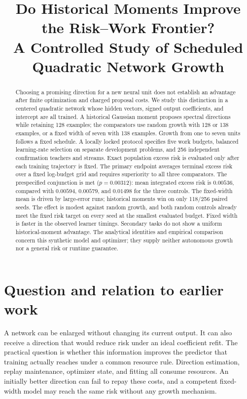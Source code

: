 \documentclass[10pt]{article}
\title{Do Historical Moments Improve the Risk--Work Frontier?\\
\large A Controlled Study of Scheduled Quadratic Network Growth}
\begin{document}
\maketitle
\begin{abstract}
Choosing a promising direction for a new neural unit does not establish an
advantage after finite optimization and charged proposal costs. We study
this distinction in a centered quadratic network whose hidden vectors,
signed output coefficients, and intercept are all trained. A historical
Gaussian moment proposes spectral directions while retaining 128 examples;
the comparators use random growth with 128 or 138 examples, or a fixed
width of seven with 138 examples. Growth from one to seven units follows
a fixed schedule. A locally locked protocol specifies five work budgets,
balanced learning-rate selection on separate development problems, and
256 independent confirmation teachers and streams. Exact population
excess risk is evaluated only after each training trajectory is fixed.
The primary endpoint averages terminal excess risk over a fixed
log-budget grid and requires superiority to all three comparators.
The prespecified conjunction is met ($p=0.00312$): mean integrated
excess risk is $0.00536$, compared with $0.00594$, $0.00579$, and
$0.01498$ for the three controls. The fixed-width mean is driven by
large-error runs; historical moments win on only 118/256 paired seeds.
The effect is modest against random growth, and both random controls already meet the fixed risk target
on every seed at the smallest evaluated budget. Fixed width is faster
in the observed learner timings. Secondary tasks do not show a
uniform historical-moment advantage.
The analytical identities and empirical comparison concern this synthetic
model and optimizer; they supply neither autonomous growth nor a general
risk or runtime guarantee.
\end{abstract}

\section{Question and relation to earlier work}
\label{sec:introduction}

A network can be enlarged without changing its current output. It can
also receive a direction that would reduce risk under an ideal coefficient
refit. The practical question is whether this information improves the
predictor that training actually reaches under a common resource rule.
Direction estimation, replay maintenance, optimizer state, and fitting
all consume resources. An initially better direction can fail to repay
these costs, and a competent fixed-width model may reach the same risk
without any growth mechanism.
\end{document}
